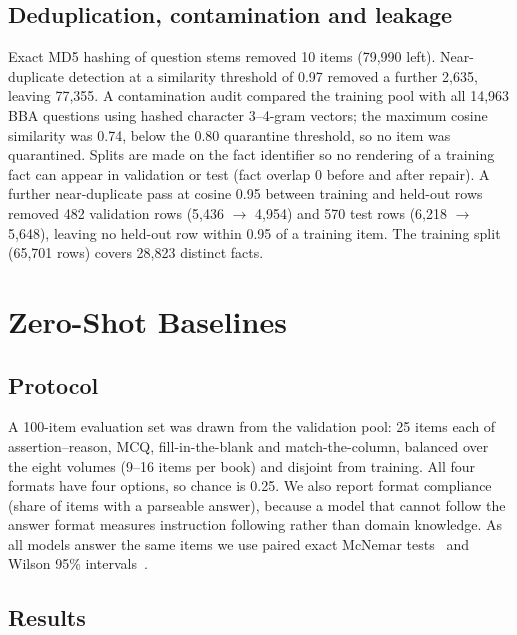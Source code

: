 \documentclass[10pt,twocolumn,letterpaper]{article}
\begin{document}
\subsection{Deduplication, contamination and leakage}

Exact MD5 hashing of question stems removed 10 items (79{,}990 left).
Near-duplicate detection at a similarity threshold of 0.97 removed a further
2{,}635, leaving 77{,}355. A contamination audit compared the training pool with
all 14{,}963 BBA questions using hashed character 3--4-gram vectors; the maximum
cosine similarity was 0.74, below the 0.80 quarantine threshold, so no item was
quarantined. Splits are made on the fact identifier so no rendering of a training
fact can appear in validation or test (fact overlap 0 before and after repair). A
further near-duplicate pass at cosine 0.95 between training and held-out rows
removed 482 validation rows (5{,}436 $\to$ 4{,}954) and 570 test rows (6{,}218
$\to$ 5{,}648), leaving no held-out row within 0.95 of a training item. The
training split (65{,}701 rows) covers 28{,}823 distinct facts.

\section{Zero-Shot Baselines}
\label{sec:baselines}

\subsection{Protocol}

A 100-item evaluation set was drawn from the validation pool: 25 items each of
assertion--reason, MCQ, fill-in-the-blank and match-the-column, balanced over the
eight volumes (9--16 items per book) and disjoint from training. All four formats
have four options, so chance is 0.25. We also report format compliance (share of
items with a parseable answer), because a model that cannot follow the answer
format measures instruction following rather than domain knowledge. As all models
answer the same items we use paired exact McNemar tests~\cite{mcnemar} and
Wilson 95\% intervals~\cite{wilson}.

\subsection{Results}
\end{document}
